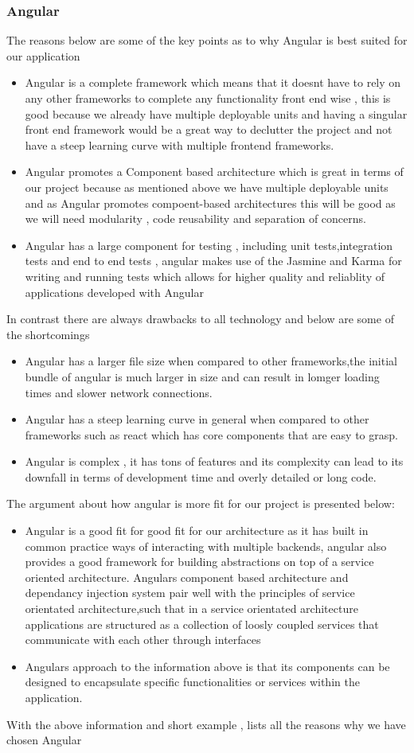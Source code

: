 \documentclass[12pt]{article}
\begin{document}
\subsubsection{Angular}
The reasons below are some of the key points as to why Angular is best suited for our application
\begin{itemize}
    \item Angular is a complete framework which means that it doesnt have to rely on any other frameworks to complete any functionality front end wise , this is good because we already have multiple deployable units and having a singular front end framework would be a great way to declutter the project and not have a steep learning curve with multiple frontend frameworks.
    \item Angular promotes a Component based architecture which is great in terms of our project because as mentioned above we have multiple deployable units and as Angular promotes compoent-based architectures this will be good as we will need modularity , code reusability and separation of concerns.
    \item Angular has a large component for testing , including unit tests,integration tests and end to end tests , angular makes use of the Jasmine and Karma for writing and running tests which allows for higher quality and reliablity of applications developed with Angular
\end{itemize}
In contrast there are always drawbacks to all technology and below are some of the shortcomings
\begin{itemize}
    \item Angular has a larger file size when compared to other frameworks,the initial bundle of angular is much larger in size and can result in lomger loading times and slower network connections.
    \item Angular has a steep learning curve in general when compared to other frameworks such as react which has core components that are easy to grasp.
    \item Angular is complex , it has tons of features and its complexity can lead to its downfall in terms of development time and overly detailed or long code.
\end{itemize}
The argument about how angular is more fit for our project is presented below:
\begin{itemize}
    \item Angular is a good fit for good fit for our architecture as it has built in common practice ways of interacting with multiple backends, angular also provides a good framework for building abstractions on top of a service oriented architecture. Angulars component based architecture and dependancy injection system pair well with the principles of service orientated architecture,such that in a service orientated architecture applications are structured as a collection of loosly coupled services that communicate with each other through interfaces
    \item Angulars approach to the information above is that its components can be designed to encapsulate specific functionalities or services within the application.
\end{itemize}
With the above information and short example , lists all the reasons why we have chosen Angular
\end{document}
